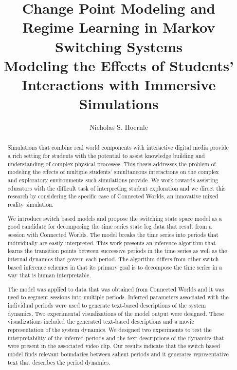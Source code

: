 \documentclass[11pt]{gsasthesis} %
\title{Change Point Modeling and Regime Learning in Markov Switching Systems \\
 \large Modeling the Effects of Students' Interactions with Immersive Simulations} %
\author{Nicholas S. Hoernle} %
\begin{document}


\thesistitlepage
\begin{abstract}
Simulations that combine real world components with interactive digital media provide a rich setting for students with the potential to assist knowledge building and understanding of complex physical processes. This thesis addresses the problem of modeling the effects of multiple students' simultaneous interactions on the complex and exploratory environments such simulations provide. We work towards assisting educators with the difficult task of interpreting student exploration and we direct this research by considering the specific case of Connected Worlds, an innovative mixed reality simulation.


We introduce switch based models and propose the switching state space model as a good candidate for decomposing the time series state log data that result from a session with Connected Worlds. The model breaks the time series into periods that individually are easily interpreted. This work presents an inference algorithm that learns the transition points between successive periods in the time series as well as the internal dynamics that govern each period. The algorithm differs from other switch based inference schemes in that its primary goal is to decompose the time series in a way that is human interpretable.

The model was applied to data that was obtained from Connected Worlds and it was used to segment sessions into multiple periods. Inferred parameters associated with the individual periods were used to generate text-based descriptions of the system dynamics. Two experimental visualizations of the model output were designed. These visualizations included the generated text-based descriptions and a movie representation of the system dynamics. We designed two experiments to test the interpretability of the inferred periods and the text descriptions of the dynamics that were present in the associated video clip. Our results indicate that the switch based model finds relevant boundaries between salient periods and it generates representative text that describes the period dynamics.
\end{abstract}
\end{document}

